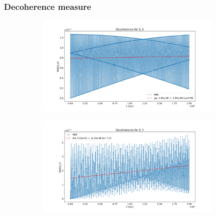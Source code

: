 \documentclass{beamer}
\begin{document}
\begin{frame}\frametitle{Decoherence measure}
  \begin{figure}[H]
    \centering
    \begin{subfigure}[t]{\textwidth}\centering
      \includegraphics[height=.4\paperheight, trim=85 25 120 55, clip]{../img/SEMINAR/SX_decoh_20sec_unopt}
    \end{subfigure}

    \begin{subfigure}[t]{\textwidth}\centering
      \includegraphics[height=.4\paperheight, trim=85 25 120 55, clip]{../img/SEMINAR/SY_decoh_20sec_unopt}
    \end{subfigure}
  \end{figure}
\end{frame}
\end{document}
